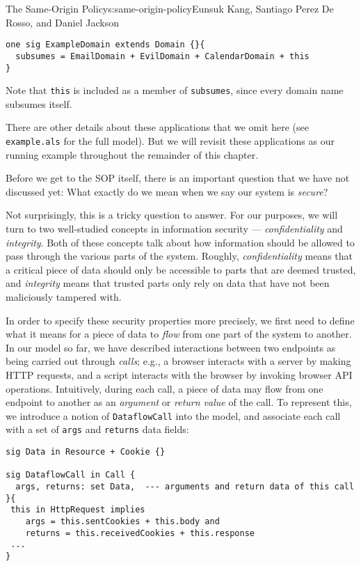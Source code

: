\begin{aosachapter}{The Same-Origin Policy}{s:same-origin-policy}{Eunsuk Kang, Santiago Perez De Rosso, and Daniel Jackson}
\begin{verbatim}
one sig ExampleDomain extends Domain {}{
  subsumes = EmailDomain + EvilDomain + CalendarDomain + this
}   
\end{verbatim}

Note that \texttt{this} is included as a member of \texttt{subsumes},
since every domain name subsumes itself.

There are other details about these applications that we omit here (see
\texttt{example.als} for the full model). But we will revisit these
applications as our running example throughout the remainder of this
chapter.

\label{security-properties}

Before we get to the SOP itself, there is an important question that we
have not discussed yet: What exactly do we mean when we say our system
is \emph{secure}?

Not surprisingly, this is a tricky question to answer. For our purposes,
we will turn to two well-studied concepts in information security ---
\emph{confidentiality} and \emph{integrity}. Both of these concepts talk
about how information should be allowed to pass through the various
parts of the system. Roughly, \emph{confidentiality} means that a
critical piece of data should only be accessible to parts that are
deemed trusted, and \emph{integrity} means that trusted parts only rely
on data that have not been maliciously tampered with.

\label{dataflow-properties}

In order to specify these security properties more precisely, we first
need to define what it means for a piece of data to \emph{flow} from one
part of the system to another. In our model so far, we have described
interactions between two endpoints as being carried out through
\emph{calls}; e.g., a browser interacts with a server by making HTTP
requests, and a script interacts with the browser by invoking browser
API operations. Intuitively, during each call, a piece of data may flow
from one endpoint to another as an \emph{argument} or \emph{return
value} of the call. To represent this, we introduce a notion of
\texttt{DataflowCall} into the model, and associate each call with a set
of \texttt{args} and \texttt{returns} data fields:

\begin{verbatim}
sig Data in Resource + Cookie {}

sig DataflowCall in Call {
  args, returns: set Data,  --- arguments and return data of this call
}{
 this in HttpRequest implies
    args = this.sentCookies + this.body and
    returns = this.receivedCookies + this.response
 ...
}
\end{verbatim}


\end{aosachapter}
